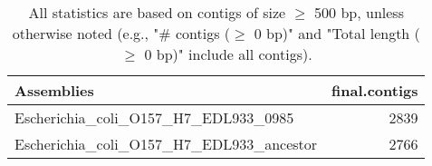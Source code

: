 \documentclass[12pt,a4paper]{article}
\begin{document}
\begin{table}[ht]
\begin{center}
\caption{All statistics are based on contigs of size $\geq$ 500 bp, unless otherwise noted (e.g., "\# contigs ($\geq$ 0 bp)" and "Total length ($\geq$ 0 bp)" include all contigs).}
\begin{tabular}{|l*{1}{|r}|}
\hline
Assemblies & final.contigs \\ \hline
Escherichia\_coli\_O157\_H7\_EDL933\_0985 & 2839 \\ \hline
Escherichia\_coli\_O157\_H7\_EDL933\_ancestor & 2766 \\ \hline
\end{tabular}
\end{center}
\end{table}
\end{document}
